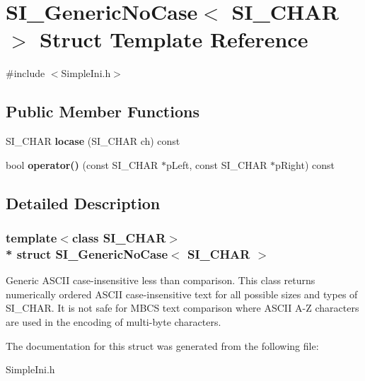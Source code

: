 \hypertarget{structSI__GenericNoCase}{}\section{S\+I\+\_\+\+Generic\+No\+Case$<$ S\+I\+\_\+\+C\+H\+AR $>$ Struct Template Reference}
\label{structSI__GenericNoCase}


{\ttfamily \#include $<$Simple\+Ini.\+h$>$}

\subsection*{Public Member Functions}
\begin{DoxyCompactItemize}
\item 
S\+I\+\_\+\+C\+H\+AR {\bfseries locase} (S\+I\+\_\+\+C\+H\+AR ch) const \hypertarget{structSI__GenericNoCase_adc6bb2ca8960d24913b598a2f3085e7c}{}\label{structSI__GenericNoCase_adc6bb2ca8960d24913b598a2f3085e7c}

\item 
bool {\bfseries operator()} (const S\+I\+\_\+\+C\+H\+AR $\ast$p\+Left, const S\+I\+\_\+\+C\+H\+AR $\ast$p\+Right) const \hypertarget{structSI__GenericNoCase_aa8014f86b3d74b2cd0f6e9b6ccc43426}{}\label{structSI__GenericNoCase_aa8014f86b3d74b2cd0f6e9b6ccc43426}

\end{DoxyCompactItemize}


\subsection{Detailed Description}
\subsubsection*{template$<$class S\+I\+\_\+\+C\+H\+AR$>$\\*
struct S\+I\+\_\+\+Generic\+No\+Case$<$ S\+I\+\_\+\+C\+H\+A\+R $>$}

Generic A\+S\+C\+II case-\/insensitive less than comparison. This class returns numerically ordered A\+S\+C\+II case-\/insensitive text for all possible sizes and types of S\+I\+\_\+\+C\+H\+AR. It is not safe for M\+B\+CS text comparison where A\+S\+C\+II A-\/Z characters are used in the encoding of multi-\/byte characters. 

The documentation for this struct was generated from the following file\+:\begin{DoxyCompactItemize}
\item 
Simple\+Ini.\+h\end{DoxyCompactItemize}
